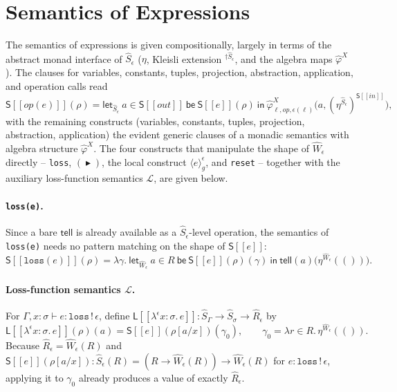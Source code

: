 \documentclass[11pt]{article}
\theoremstyle{plain}
\newcommand{\Ssem}[1]{\mathsf{S}[\![#1]\!]}
\newcommand{\Lsem}[1]{\mathsf{L}[\![#1]\!]}
\newcommand{\Wm}[1]{\widehat{W}_{#1}}
\newcommand{\Rm}[1]{\widehat{R}_{#1}}
\newcommand{\Sm}[1]{\widehat{S}_{#1}}
\newcommand{\eps}{\epsilon}
\newcommand{\dg}[1]{^{\dagger #1}}
\newcommand{\op}{\mathit{op}}
\newcommand{\then}{\mathrel{\blacktriangleright}}
\newcommand{\loc}[1]{\langle #1 \rangle} %
\newcommand{\tell}{\mathsf{tell}}
\begin{document}
\section{Semantics of Expressions}

The semantics of expressions is given compositionally, largely in terms of the abstract
monad interface of $\widehat S_\eps$ ($\eta$, Kleisli extension $\dg{\widehat S_\eps}$, and
the algebra maps $\widehat\varphi^X$). The clauses for variables, constants, tuples,
projection, abstraction, application, and operation calls read
\[
  \Ssem{\op(e)}(\rho) = \mathsf{let}_{\widehat S_\eps}\ a\in\Ssem{\mathit{out}}\ \mathsf{be}\ \Ssem{e}(\rho)
     \ \mathsf{in}\ \widehat\varphi^X_{\ell,\op,\eps(\ell)}\big(a,(\eta^{\widehat S_\eps})^{\Ssem{\mathit{in}}}\big),
\]
with the remaining constructs (variables, constants, tuples, projection, abstraction,
application) the evident generic clauses of a monadic semantics with algebra structure
$\widehat\varphi^X$. The four constructs that manipulate the shape of $\Wm\eps$
directly -- \texttt{loss}, $(\then)$, the local construct $\loc{e}_g^\eps$, and
\texttt{reset} -- together with the auxiliary loss-function semantics $\mathcal L$, are
given below.

\paragraph{\texttt{loss(e)}.} Since a bare $\tell$ is already available as a
$\widehat S_\eps$-level operation, the semantics of \texttt{loss(e)} needs no pattern
matching on the shape of $\Ssem e$:
\[
  \Ssem{\mathtt{loss}(e)}(\rho) = \lambda\gamma.\
    \mathsf{let}_{\Wm\eps}\ a\in R\ \mathsf{be}\ \Ssem{e}(\rho)(\gamma)\ \mathsf{in}\
    \tell(a)\big(\eta^{\Wm\eps}(())\big).
\]

\paragraph{Loss-function semantics $\mathcal L$.} For $\Gamma,x\!:\!\sigma\vdash e:\mathtt{loss}\,!\,\eps$,
define $\Lsem{\lambda^\eps x\!:\!\sigma.\,e} : \Sm\Gamma \to \Sm\sigma \to \Rm\eps$ by
\[
  \Lsem{\lambda^\eps x\!:\!\sigma.\,e}(\rho)(a) = \Ssem{e}(\rho[a/x])(\gamma_0),
  \qquad \gamma_0 = \lambda r{\in}R.\,\eta^{\Wm\eps}(()).
\]
Because $\Rm\eps=\Wm\eps(R)$ and $\Ssem{e}(\rho[a/x]):\widehat S_\eps(R) =
(R\to\Wm\eps(R))\to\Wm\eps(R)$ for $e:\mathtt{loss}\,!\,\eps$, applying it to $\gamma_0$
already produces a value of exactly $\Rm\eps$.
\end{document}
